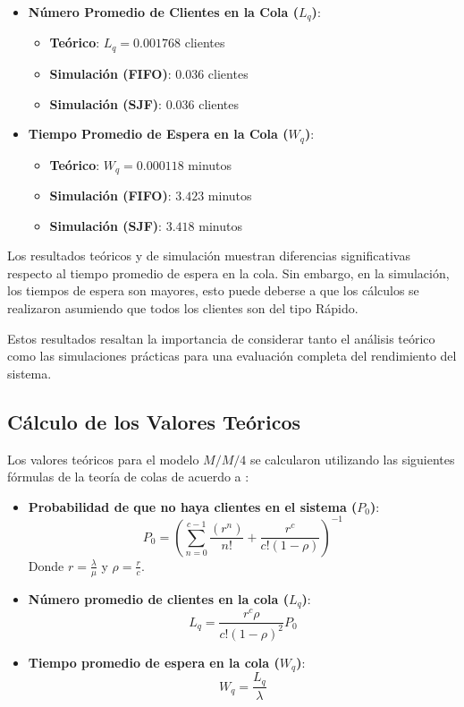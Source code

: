 \documentclass[10pt,twocolumn]{article}
\begin{document}
\begin{itemize}
	\item \textbf{Número Promedio de Clientes en la Cola ($L_q$)}:
	\begin{itemize}
		\item \textbf{Teórico}: $L_q = 0.001768$ clientes
		\item \textbf{Simulación (FIFO)}: $0.036$ clientes
		\item \textbf{Simulación (SJF)}: $0.036$ clientes
	\end{itemize}
	\item \textbf{Tiempo Promedio de Espera en la Cola ($W_q$)}:
	\begin{itemize}
		\item \textbf{Teórico}: $W_q = 0.000118$ minutos
		\item \textbf{Simulación (FIFO)}: $3.423$ minutos
		\item \textbf{Simulación (SJF)}: $3.418$ minutos
	\end{itemize}
\end{itemize}

Los resultados teóricos y de simulación muestran diferencias significativas respecto al tiempo promedio de espera en la cola. Sin embargo, en la simulación, los tiempos de espera son mayores, esto puede deberse a que los cálculos se realizaron asumiendo que todos los clientes son del tipo Rápido.

Estos resultados resaltan la importancia de considerar tanto el análisis teórico como las simulaciones prácticas para una evaluación completa del rendimiento del sistema.

\subsection{Cálculo de los Valores Teóricos}

Los valores teóricos para el modelo $M/M/4$ se calcularon utilizando las siguientes fórmulas de la teoría de colas de acuerdo a \cite{teoria_de_colas}:

\begin{itemize}
	\item \textbf{Probabilidad de que no haya clientes en el sistema ($P_0$)}:
	\[
	P_0 = \left( \sum_{n=0}^{c-1} \frac{(r^n)}{n!} + \frac{r^c}{c!(1-\rho)} \right)^{-1}
	\]
	Donde $r = \frac{\lambda}{\mu}$ y $\rho = \frac{r}{c}$.
	\item \textbf{Número promedio de clientes en la cola ($L_q$)}:
	\[
	L_q = \frac{r^c \rho}{c!(1-\rho)^2} P_0
	\]
	\item \textbf{Tiempo promedio de espera en la cola ($W_q$)}:
	\[
	W_q = \frac{L_q}{\lambda}
	\]
\end{itemize}
\end{document}
